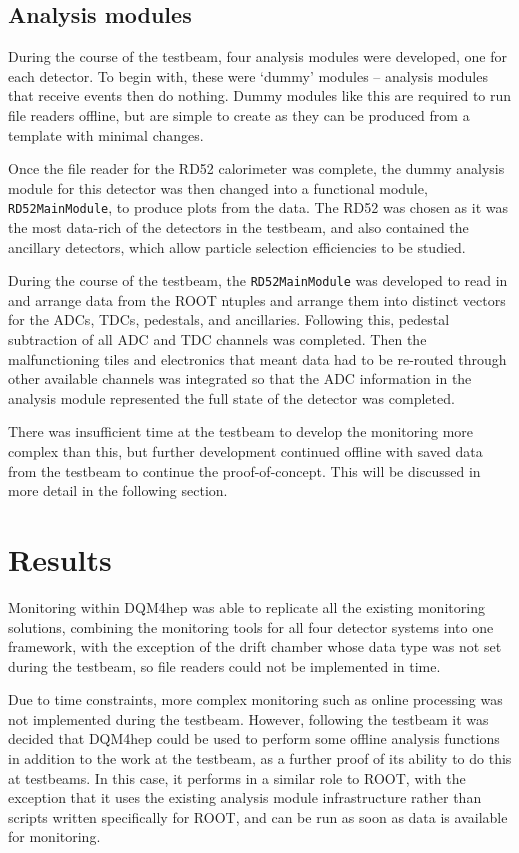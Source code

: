 \subsection{Analysis modules}
During the course of the testbeam, four analysis modules were developed, one for each detector. To begin with, these were `dummy' modules -- analysis modules that receive events then do nothing. Dummy modules like this are required to run file readers offline, but are simple to create as they can be produced from a template with minimal changes.

Once the file reader for the RD52 calorimeter was complete, the dummy analysis module for this detector was then changed into a functional module, \texttt{RD52MainModule}, to produce plots from the data. The RD52 was chosen as it was the most data-rich of the detectors in the testbeam, and also contained the ancillary detectors, which allow particle selection efficiencies to be studied.

During the course of the testbeam, the \texttt{RD52MainModule} was developed to read in and arrange data from the ROOT ntuples and arrange them into distinct vectors for the \acrshort{ADC}s, \acrshort{TDC}s, pedestals, and ancillaries. Following this, pedestal subtraction of all \acrshort{ADC} and \acrshort{TDC} channels was completed. Then the malfunctioning tiles and electronics that meant data had to be re-routed through other available channels was integrated so that the \acrshort{ADC} information in the analysis module represented the full state of the detector was completed. 

There was insufficient time at the testbeam to develop the monitoring more complex than this, but further development continued offline with saved data from the testbeam to continue the proof-of-concept. This will be discussed in more detail in the following section.

\section{Results}
Monitoring within \acrshort{DQM4hep} was able to replicate all the existing monitoring solutions, combining the monitoring tools for all four detector systems into one framework, with the exception of the drift chamber whose data type was not set during the testbeam, so file readers could not be implemented in time. 

Due to time constraints, more complex monitoring such as online processing was not implemented during the testbeam. However, following the testbeam it was decided that \acrshort{DQM4hep} could be used to perform some offline analysis functions in addition to the work at the testbeam, as a further proof of its ability to do this at testbeams. In this case, it performs in a similar role to ROOT, with the exception that it uses the existing analysis module infrastructure rather than scripts written specifically for ROOT, and can be run as soon as data is available for monitoring.


